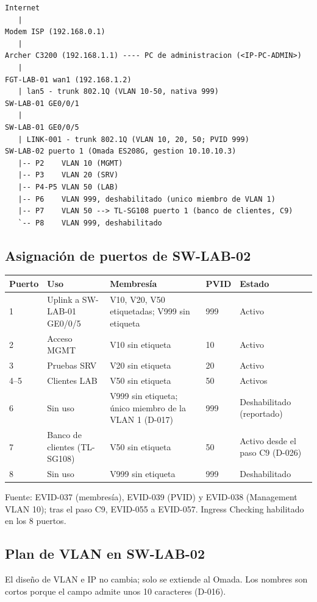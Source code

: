 \documentclass[11pt,a4paper]{article}
\newcommand{\cab}{\rowcolor{light}}
\begin{document}
\begin{lstlisting}
Internet
   |
Modem ISP (192.168.0.1)
   |
Archer C3200 (192.168.1.1) ---- PC de administracion (<IP-PC-ADMIN>)
   |
FGT-LAB-01 wan1 (192.168.1.2)
   | lan5 - trunk 802.1Q (VLAN 10-50, nativa 999)
SW-LAB-01 GE0/0/1
   |
SW-LAB-01 GE0/0/5
   | LINK-001 - trunk 802.1Q (VLAN 10, 20, 50; PVID 999)
SW-LAB-02 puerto 1 (Omada ES208G, gestion 10.10.10.3)
   |-- P2    VLAN 10 (MGMT)
   |-- P3    VLAN 20 (SRV)
   |-- P4-P5 VLAN 50 (LAB)
   |-- P6    VLAN 999, deshabilitado (unico miembro de VLAN 1)
   |-- P7    VLAN 50 --> TL-SG108 puerto 1 (banco de clientes, C9)
   `-- P8    VLAN 999, deshabilitado
\end{lstlisting}

\subsection{Asignación de puertos de SW-LAB-02}
{\small
\begin{longtable}{L{1.3cm} L{3.3cm} L{4.5cm} L{1.2cm} L{3.95cm}}
  \toprule
  \cab\textbf{Puerto} & \textbf{Uso} & \textbf{Membresía} & \textbf{PVID} & \textbf{Estado}\\
  \midrule
   & Uplink a SW-LAB-01 GE0/0/5 & V10, V20, V50 etiquetadas; V999 sin etiqueta & 999 & Activo\\
  2 & Acceso MGMT & V10 sin etiqueta & 10 & Activo\\
  3 & Pruebas SRV & V20 sin etiqueta & 20 & Activo\\
  4--5 & Clientes LAB & V50 sin etiqueta & 50 & Activos\\
  6 & Sin uso & V999 sin etiqueta; único miembro de la VLAN 1 (D-017) & 999 & Deshabilitado (reportado)\\
  7 & Banco de clientes (TL-SG108) & V50 sin etiqueta & 50 & Activo desde el paso C9 (D-026)\\
  8 & Sin uso & V999 sin etiqueta & 999 & Deshabilitado\\
  \bottomrule
\end{longtable}
}

Fuente: EVID-037 (membresía), EVID-039 (PVID) y EVID-038 (Management VLAN 10); tras el paso C9, EVID-055 a EVID-057. Ingress Checking habilitado en los 8 puertos.

\subsection{Plan de VLAN en SW-LAB-02}
El diseño de VLAN e IP no cambia; solo se extiende al Omada. Los nombres son cortos porque el campo admite unos 10 caracteres (D-016).
\end{document}

